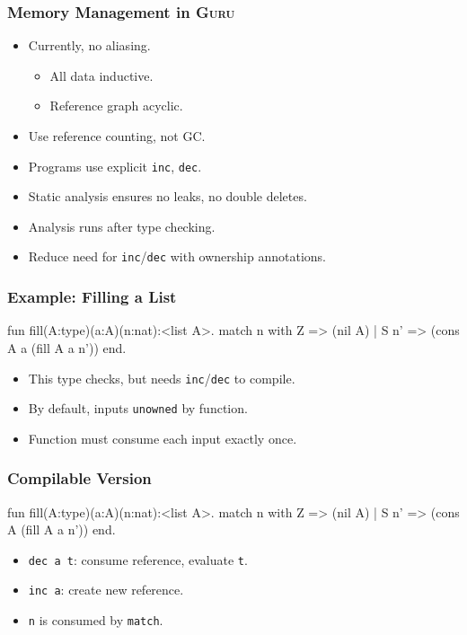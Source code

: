 \documentclass[11pt]{beamer}
\begin{document}
\begin{frame}
\frametitle{Memory Management in \textsc{Guru}}

\begin{itemize}
\item Currently, no aliasing.
\begin{itemize}
\item All data inductive.
\item Reference graph acyclic.
\end{itemize}
\item Use reference counting, not GC.
\item Programs use explicit \texttt{inc}, \texttt{dec}.
\item Static analysis ensures no leaks, no double deletes.
\item Analysis runs after type checking.
\item Reduce need for \texttt{inc}/\texttt{dec} with ownership annotations.
\end{itemize}

\end{frame}

\begin{frame}[containsverbatim]
\frametitle{Example: Filling a List}
\begin{code}
fun fill(A:type)(a:A)(n:nat):<list A>.
  match n with
    Z => (nil A)
  | S n' => (cons A a (fill A a n'))
  end.
\end{code}

\begin{itemize}
\item This type checks, but needs \texttt{inc}/\texttt{dec} to compile.
\item By default, inputs \texttt{unowned} by function.
\item Function must consume each input exactly once.
\end{itemize}
\end{frame}

\begin{frame}[containsverbatim]
\frametitle{Compilable Version}
\begin{code}
fun fill(A:type)(a:A)(n:nat):<list A>.
  match n with
    Z =>  (nil A)
  | S n' => (cons A  (fill A a n'))
  end.
\end{code}

\begin{itemize}
\item \texttt{dec a t}: consume reference, evaluate \texttt{t}.
\item \texttt{inc a}: create new reference.
\item \texttt{n} is consumed by \texttt{match}.
\end{itemize}
\end{frame}
\end{document}

